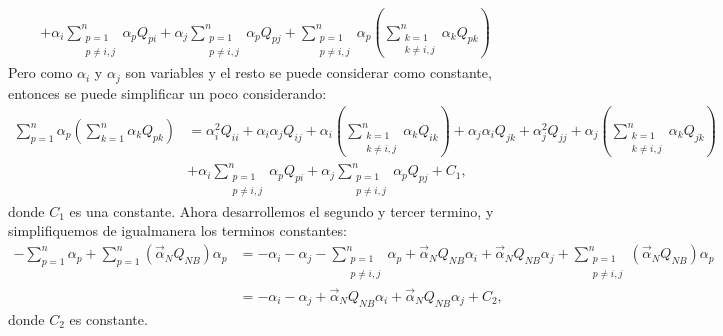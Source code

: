 \documentclass[11pt,letterpaper]{article}
\newcommand{\sumk}{\sum_{k=1}^n}
\begin{document}
\begin{enumerate}
\begin{align*}
&+\alpha_i\sum_{\substack{p=1 \\ p\neq i,j}}^n \alpha_pQ_{pi}+\alpha_j\sum_{\substack{p=1 \\ p\neq i,j}}^n \alpha_pQ_{pj}+\sum_{\substack{p=1 \\ p\neq i,j}}^n \alpha_p \left( \sum_{\substack{k=1\\ k\neq i,j}}^n \alpha_k Q_{pk}\right)
\end{align*}
Pero como $\alpha_i$ y $\alpha_j$ son variables y el resto se puede considerar como constante, entonces se puede simplificar un poco considerando:
\begin{align*}
\sum_{p=1}^n \alpha_p \left( \sumk \alpha_k Q_{pk}\right)&=\alpha_i^2Q_{ii}+\alpha_i\alpha_jQ_{ij} + \alpha_i \left( \sum_{\substack{k=1\\ k\neq i,j}}^n  \alpha_k Q_{ik}\right)+\alpha_j\alpha_iQ_{jk}+\alpha_j^2Q_{jj}+\alpha_j \left( \sum_{\substack{k=1\\ k\neq i,j}}^n \alpha_k Q_{jk}\right)\\
&+\alpha_i\sum_{\substack{p=1 \\ p\neq i,j}}^n \alpha_pQ_{pi}+\alpha_j\sum_{\substack{p=1 \\ p\neq i,j}}^n \alpha_pQ_{pj}+C_1,
\end{align*}
donde $C_1$ es una constante. Ahora desarrollemos el segundo y tercer termino, y simplifiquemos de igualmanera los terminos constantes:
\begin{align*}
-\sum_{p=1}^n \alpha_p +\sum_{p=1}^n \left(\overrightarrow{\alpha}_N Q_{NB}\right)\alpha_p&=-\alpha_i-\alpha_j-\sum_{\substack{p=1\\ p\neq i,j}}^n \alpha_p +\overrightarrow{\alpha}_N Q_{NB}\alpha_i+\overrightarrow{\alpha}_N Q_{NB}\alpha_j+\sum_{\substack{p=1\\ p\neq i,j}}^n \left(\overrightarrow{\alpha}_N Q_{NB}\right)\alpha_p\\
&=-\alpha_i-\alpha_j+\overrightarrow{\alpha}_N Q_{NB}\alpha_i+\overrightarrow{\alpha}_N Q_{NB}\alpha_j+C_2,
\end{align*}
donde $C_2$ es constante.


\end{enumerate}
\end{document}

